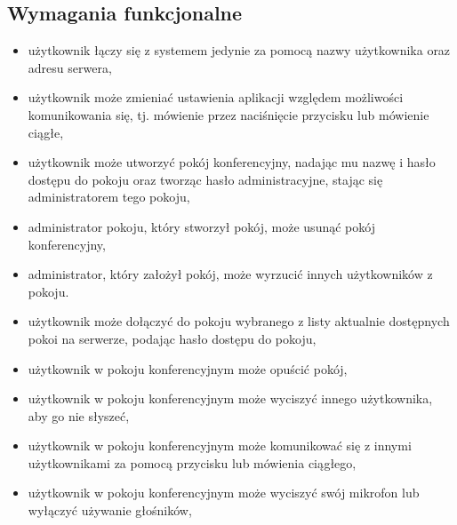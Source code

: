 \documentclass{article}
\begin{document}
	\subsection{Wymagania funkcjonalne}
	\begin{itemize}
		\item użytkownik łączy się z systemem jedynie za pomocą nazwy użytkownika oraz adresu serwera,
		\item użytkownik może zmieniać ustawienia aplikacji względem możliwości komunikowania się, tj. mówienie przez naciśnięcie przycisku lub mówienie ciągłe,
		\item użytkownik może utworzyć pokój konferencyjny, nadając mu nazwę i hasło dostępu do pokoju oraz tworząc hasło administracyjne, stając się administratorem tego pokoju,
		\item administrator pokoju, który stworzył pokój, może usunąć pokój konferencyjny,
		\item administrator, który założył pokój, może wyrzucić innych użytkowników z pokoju.
		\item użytkownik może dołączyć do pokoju wybranego z listy aktualnie dostępnych pokoi na serwerze, podając hasło dostępu do pokoju,
		\item użytkownik w pokoju konferencyjnym może opuścić pokój,
		\item użytkownik w pokoju konferencyjnym może wyciszyć innego użytkownika, aby go nie słyszeć,
		\item użytkownik w pokoju konferencyjnym może komunikować się z innymi użytkownikami za pomocą przycisku lub mówienia ciągłego,
		\item użytkownik w pokoju konferencyjnym może wyciszyć swój mikrofon lub wyłączyć używanie głośników,
		
	\end{itemize}
\end{document}
